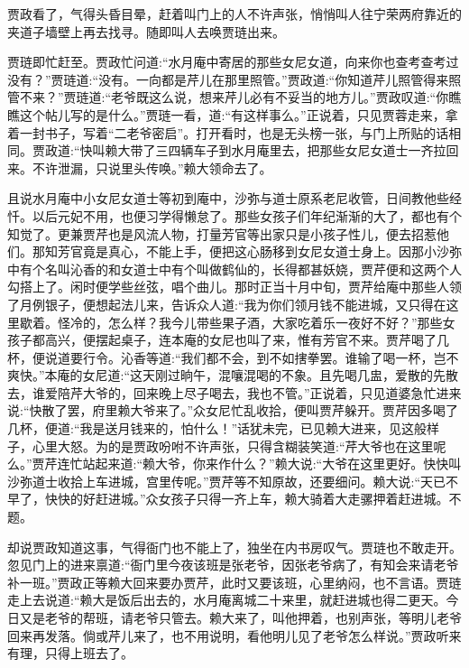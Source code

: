 \begin{parag}
    贾政看了，气得头昏目晕，赶着叫门上的人不许声张，悄悄叫人往宁荣两府靠近的夹道子墙壁上再去找寻。随即叫人去唤贾琏出来。
\end{parag}


\begin{parag}
    贾琏即忙赶至。贾政忙问道:“水月庵中寄居的那些女尼女道，向来你也查考查考过没有？”贾琏道:“没有。一向都是芹儿在那里照管。”贾政道:“你知道芹儿照管得来照管不来？”贾琏道:“老爷既这么说，想来芹儿必有不妥当的地方儿。”贾政叹道:“你瞧瞧这个帖儿写的是什么。”贾琏一看，道:“有这样事么。”正说着，只见贾蓉走来，拿着一封书子，写着“二老爷密启”。打开看时，也是无头榜一张，与门上所贴的话相同。贾政道:“快叫赖大带了三四辆车子到水月庵里去，把那些女尼女道士一齐拉回来。不许泄漏，只说里头传唤。”赖大领命去了。
\end{parag}


\begin{parag}
    且说水月庵中小女尼女道士等初到庵中，沙弥与道士原系老尼收管，日间教他些经忏。以后元妃不用，也便习学得懒怠了。那些女孩子们年纪渐渐的大了，都也有个知觉了。更兼贾芹也是风流人物，打量芳官等出家只是小孩子性儿，便去招惹他们。那知芳官竟是真心，不能上手，便把这心肠移到女尼女道士身上。因那小沙弥中有个名叫沁香的和女道士中有个叫做鹤仙的，长得都甚妖娆，贾芹便和这两个人勾搭上了。闲时便学些丝弦，唱个曲儿。那时正当十月中旬，贾芹给庵中那些人领了月例银子，便想起法儿来，告诉众人道:“我为你们领月钱不能进城，又只得在这里歇着。怪冷的，怎么样？我今儿带些果子酒，大家吃着乐一夜好不好？”那些女孩子都高兴，便摆起桌子，连本庵的女尼也叫了来，惟有芳官不来。贾芹喝了几杯，便说道要行令。沁香等道:“我们都不会，到不如搳拳罢。谁输了喝一杯，岂不爽快。”本庵的女尼道:“这天刚过晌午，混嚷混喝的不象。且先喝几盅，爱散的先散去，谁爱陪芹大爷的，回来晚上尽子喝去，我也不管。”正说着，只见道婆急忙进来说:“快散了罢，府里赖大爷来了。”众女尼忙乱收拾，便叫贾芹躲开。贾芹因多喝了几杯，便道:“我是送月钱来的，怕什么！”话犹未完，已见赖大进来，见这般样子，心里大怒。为的是贾政吩咐不许声张，只得含糊装笑道:“芹大爷也在这里呢么。”贾芹连忙站起来道:“赖大爷，你来作什么？”赖大说:“大爷在这里更好。快快叫沙弥道士收拾上车进城，宫里传呢。”贾芹等不知原故，还要细问。赖大说:“天已不早了，快快的好赶进城。”众女孩子只得一齐上车，赖大骑着大走骡押着赶进城。不题。
\end{parag}


\begin{parag}
    却说贾政知道这事，气得衙门也不能上了，独坐在内书房叹气。贾琏也不敢走开。忽见门上的进来禀道:“衙门里今夜该班是张老爷，因张老爷病了，有知会来请老爷补一班。”贾政正等赖大回来要办贾芹，此时又要该班，心里纳闷，也不言语。贾琏走上去说道:“赖大是饭后出去的，水月庵离城二十来里，就赶进城也得二更天。今日又是老爷的帮班，请老爷只管去。赖大来了，叫他押着，也别声张，等明儿老爷回来再发落。倘或芹儿来了，也不用说明，看他明儿见了老爷怎么样说。”贾政听来有理，只得上班去了。
\end{parag}


